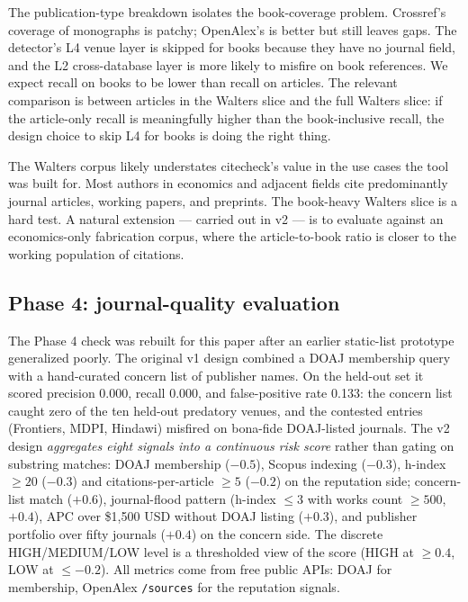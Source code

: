 \documentclass[12pt]{article}
\begin{document}
The publication-type breakdown isolates the book-coverage problem. Crossref's coverage of monographs is patchy; OpenAlex's is better but still leaves gaps. The detector's L4 venue layer is skipped for books because they have no journal field, and the L2 cross-database layer is more likely to misfire on book references. We expect recall on books to be lower than recall on articles. The relevant comparison is between articles in the Walters slice and the full Walters slice: if the article-only recall is meaningfully higher than the book-inclusive recall, the design choice to skip L4 for books is doing the right thing.

The Walters corpus likely understates citecheck's value in the use cases the tool was built for. Most authors in economics and adjacent fields cite predominantly journal articles, working papers, and preprints. The book-heavy Walters slice is a hard test. A natural extension --- carried out in v2 --- is to evaluate against an economics-only fabrication corpus, where the article-to-book ratio is closer to the working population of citations.

\subsection{Phase 4: journal-quality evaluation}\label{sec:eval-jq}

The Phase 4 check was rebuilt for this paper after an earlier static-list prototype generalized poorly. The original v1 design combined a DOAJ membership query with a hand-curated concern list of publisher names. On the held-out set it scored precision 0.000, recall 0.000, and false-positive rate 0.133: the concern list caught zero of the ten held-out predatory venues, and the contested entries (Frontiers, MDPI, Hindawi) misfired on bona-fide DOAJ-listed journals. The v2 design \emph{aggregates eight signals into a continuous risk score} rather than gating on substring matches: DOAJ membership ($-0.5$), Scopus indexing ($-0.3$), h-index $\geq 20$ ($-0.3$) and citations-per-article $\geq 5$ ($-0.2$) on the reputation side; concern-list match ($+0.6$), journal-flood pattern (h-index $\leq 3$ with works count $\geq 500$, $+0.4$), APC over \$1{,}500 USD without DOAJ listing ($+0.3$), and publisher portfolio over fifty journals ($+0.4$) on the concern side. The discrete HIGH/MEDIUM/LOW level is a thresholded view of the score (HIGH at $\geq 0.4$, LOW at $\leq -0.2$). All metrics come from free public APIs: DOAJ for membership, OpenAlex \texttt{/sources} for the reputation signals.
\end{document}
